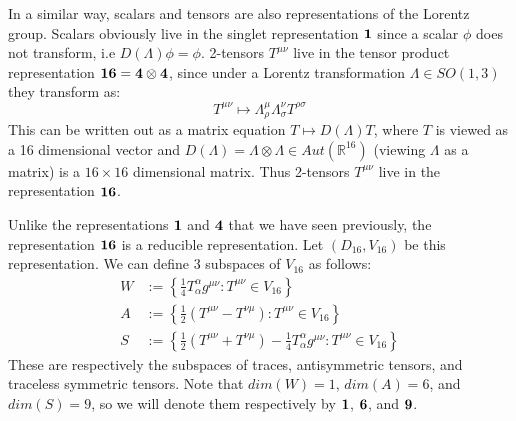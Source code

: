 \documentclass[11pt, oneside]{article}   	%
\theoremstyle{definition}
\begin{document}
In a similar way, scalars and tensors are also representations of the Lorentz group. Scalars obviously live in the singlet 
representation $\bf{1}$ since a scalar $\phi$ does not transform, i.e $D(\Lambda)\phi = \phi$. 2-tensors $T^{\mu\nu}$ live in 
the tensor product representation $\bf 16 = 4\otimes 4$, since under a Lorentz transformation $\Lambda\in SO(1, 3)$ they 
transform as:
\begin{equation}
	T^{\mu\nu}\mapsto \Lambda^\mu_\rho \Lambda^\nu_\sigma T^{\rho\sigma}
\end{equation}
This can be written out as a matrix equation $T\mapsto D(\Lambda) T$, where $T$ is viewed as a 16 dimensional vector 
and $D(\Lambda) = \Lambda\otimes\Lambda\in Aut(\mathbb R^{16})$ (viewing $\Lambda$ as a matrix) is a $16\times 16$ 
dimensional matrix. Thus 2-tensors $T^{\mu\nu}$ live in the representation $\bf 16$. 

Unlike the representations $\bf 1$ and $\bf 4$ that we have seen previously, the representation $\bf 16$ is a reducible 
representation. Let $(D_{16}, V_{16})$ be this representation. We can define 3 subspaces of $V_{16}$ as follows:
\begin{align}
	W &:= \left\{\frac{1}{4}T^\alpha_\alpha g^{\mu\nu} : T^{\mu\nu}\in V_{16}\right\}\nonumber \\
	A &:= \left\{\frac{1}{2}(T^{\mu\nu} - T^{\nu\mu}) : T^{\mu\nu} \in V_{16}\right\} \label{eq:sixteen_irreps} \\
	S &:= \left\{\frac{1}{2}(T^{\mu\nu} + T^{\nu\mu}) - \frac{1}{4} T^\alpha_\alpha g^{\mu\nu}: T^{\mu\nu} \in V_{16}\right\} 
	\nonumber
\end{align}
These are respectively the subspaces of traces, antisymmetric tensors, and traceless symmetric tensors. Note that $dim(W) = 
1$, $dim(A) = 6$, and $dim(S) = 9$, so we will denote them respectively by $\bf 1$, $\bf 6$, and $\bf 9$. 
\end{document}
